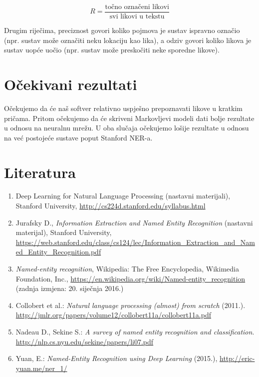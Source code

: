\documentclass[]{article}
\begin{document}
	\begin{equation*}
		R = \frac{\text{točno označeni likovi}}{\text{svi likovi u tekstu}}
	\end{equation*}
	
	Drugim riječima, preciznost govori koliko pojmova je sustav ispravno označio (npr. sustav može označiti neku lokaciju kao lika), a odziv govori koliko likova je sustav uopće uočio (npr. sustav može preskočiti neke sporedne likove).
	
	\section{Očekivani rezultati}
	
	Očekujemo da će naš softver relativno uspješno prepoznavati likove u kratkim pričama. Pritom očekujemo da će skriveni Markovljevi modeli dati bolje rezultate u odnosu na neuralnu mrežu. U oba slučaja očekujemo lošije rezultate u odnosu na već postojeće sustave poput Stanford NER-a.
	
	\section*{Literatura}
	\begin{enumerate}
		\item Deep Learning for Natural Language Processing (nastavni materijali), Stanford University, \url{http://cs224d.stanford.edu/syllabus.html}
		
		\item Jurafsky D., \textit{Information Extraction and Named Entity Recognition} (nastavni materijal), Stanford University,  \url{https://web.stanford.edu/class/cs124/lec/Information_Extraction_and_Named_Entity_Recognition.pdf}
		
		\item  \textit{Named-entity recognition},  Wikipedia: The Free Encyclopedia, Wikimedia Foundation, Inc., \url{https://en.wikipedia.org/wiki/Named-entity_recognition} (zadnja izmjena: 20. siječnja 2016.)
		
		\item Collobert et al.: \textit{Natural language processing (almost) from scratch} (2011.).  \url{http://jmlr.org/papers/volume12/collobert11a/collobert11a.pdf}
		
		\item Nadeau D., Sekine S.: \textit{A survey of named entity recognition and classification}. \url{http://nlp.cs.nyu.edu/sekine/papers/li07.pdf}
		
		\item Yuan, E.:  \textit{Named-Entity Recognition using Deep Learning} (2015.), \url{http://eric-yuan.me/ner_1/} 
	\end{enumerate}
	
\end{document}

